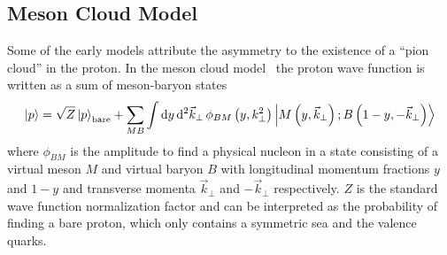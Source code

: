 \documentclass[../main.tex]{subfiles}
\begin{document}
\subsection{Meson Cloud Model}
Some of the early models attribute the asymmetry to the existence of a ``pion cloud'' in the proton.
In the meson cloud model~\cite{kumano1998,speth2002} the proton wave function is written as a sum of meson-baryon states
\begin{equation}
	\ket{p} = \sqrt{Z}\ket{p}_{\mathrm{bare}} + \sum_{MB}\int \dd{y} \dd[2]{\vec{k}_\perp} \phi_{BM} \left(y, k^2_\perp\right)\ket{M\left(y, \vec{k}_\perp\right);B\left(1-y, -\vec{k}_\perp\right)}
\end{equation}
where $\phi_{BM}$ is the amplitude to find a physical nucleon in a state consisting of a virtual
meson $M$ and virtual baryon $B$ with longitudinal momentum fractions $y$ and $1-y$ and transverse momenta
$\vec{k}_\perp$ and $-\vec{k}_\perp$ respectively. $Z$ is the standard wave function normalization factor
and can be interpreted as the probability of finding a bare proton, which only contains a symmetric sea and the valence quarks.
\end{document}
